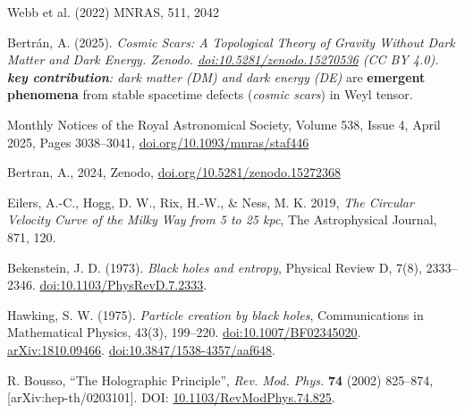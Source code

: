 \documentclass{article}
\begin{document}
\begin{thebibliography}{9}
 Webb et al. (2022) MNRAS, 511, 2042  

 Bertrán, A. (2025). \emph{Cosmic Scars: A Topological Theory of Gravity Without Dark Matter and Dark Energy. 
Zenodo. \href{https://doi.org/10.5281/zenodo.15270536}{doi:10.5281/zenodo.15270536} (CC BY 4.0). \\ 
\textbf{key contribution}: dark matter (DM) and dark energy (DE)} are \textbf{emergent phenomena} from stable spacetime defects (\textit{cosmic scars}) in Weyl tensor.

 Monthly Notices of the Royal Astronomical Society, Volume 538, Issue 4, April 2025, Pages 3038–3041, \href{https://doi.org/10.1093/mnras/staf446}{doi.org/10.1093/mnras/staf446}

Bertran, A., 2024, Zenodo, 
\href{https://doi.org/10.5281/zenodo.15272368}{doi.org/10.5281/zenodo.15272368}

Eilers, A.-C., Hogg, D. W., Rix, H.-W., \& Ness, M. K. 2019, 
\emph{The Circular Velocity Curve of the Milky Way from 5 to 25 kpc}, 
The Astrophysical Journal, 871, 120. 

Bekenstein, J. D. (1973). 
\textit{Black holes and entropy}, 
Physical Review D, 7(8), 2333–2346. 
\href{https://doi.org/10.1103/PhysRevD.7.2333}{doi:10.1103/PhysRevD.7.2333}.

Hawking, S. W. (1975). 
\textit{Particle creation by black holes}, 
Communications in Mathematical Physics, 43(3), 199–220. 
\href{https://doi.org/10.1007/BF02345020}{doi:10.1007/BF02345020}.
\href{https://arxiv.org/abs/1810.09466}{arXiv:1810.09466}. 
\href{https://doi.org/10.3847/1538-4357/aaf648}{doi:10.3847/1538-4357/aaf648}.

R. Bousso, 
``The Holographic Principle'', 
\textit{Rev. Mod. Phys.} \textbf{74} (2002) 825–874, 
[arXiv:hep-th/0203101]. 
DOI: \href{https://doi.org/10.1103/RevModPhys.74.825}{10.1103/RevModPhys.74.825}.

\end{thebibliography}
\end{document}
